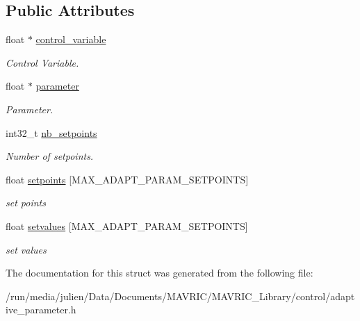 \subsection*{Public Attributes}
\begin{DoxyCompactItemize}
\item 
\hypertarget{structadaptive__parameter__t_a2214c801b54e043dba02bd31247350d7}{float $\ast$ \hyperlink{structadaptive__parameter__t_a2214c801b54e043dba02bd31247350d7}{control\+\_\+variable}}\label{structadaptive__parameter__t_a2214c801b54e043dba02bd31247350d7}

\begin{DoxyCompactList}\small\item\em Control Variable. \end{DoxyCompactList}\item 
\hypertarget{structadaptive__parameter__t_add568e1e24d0fe47caa8ff92d2de09b5}{float $\ast$ \hyperlink{structadaptive__parameter__t_add568e1e24d0fe47caa8ff92d2de09b5}{parameter}}\label{structadaptive__parameter__t_add568e1e24d0fe47caa8ff92d2de09b5}

\begin{DoxyCompactList}\small\item\em Parameter. \end{DoxyCompactList}\item 
\hypertarget{structadaptive__parameter__t_a210c6c63169d594762b9a87329bab5b0}{int32\+\_\+t \hyperlink{structadaptive__parameter__t_a210c6c63169d594762b9a87329bab5b0}{nb\+\_\+setpoints}}\label{structadaptive__parameter__t_a210c6c63169d594762b9a87329bab5b0}

\begin{DoxyCompactList}\small\item\em Number of setpoints. \end{DoxyCompactList}\item 
\hypertarget{structadaptive__parameter__t_a5226a7119476dbfa9e3da11aa798386a}{float \hyperlink{structadaptive__parameter__t_a5226a7119476dbfa9e3da11aa798386a}{setpoints} \mbox{[}M\+A\+X\+\_\+\+A\+D\+A\+P\+T\+\_\+\+P\+A\+R\+A\+M\+\_\+\+S\+E\+T\+P\+O\+I\+N\+T\+S\mbox{]}}\label{structadaptive__parameter__t_a5226a7119476dbfa9e3da11aa798386a}

\begin{DoxyCompactList}\small\item\em set points \end{DoxyCompactList}\item 
\hypertarget{structadaptive__parameter__t_af24f52ebf7fc9d40bead05710d23bc29}{float \hyperlink{structadaptive__parameter__t_af24f52ebf7fc9d40bead05710d23bc29}{setvalues} \mbox{[}M\+A\+X\+\_\+\+A\+D\+A\+P\+T\+\_\+\+P\+A\+R\+A\+M\+\_\+\+S\+E\+T\+P\+O\+I\+N\+T\+S\mbox{]}}\label{structadaptive__parameter__t_af24f52ebf7fc9d40bead05710d23bc29}

\begin{DoxyCompactList}\small\item\em set values \end{DoxyCompactList}\end{DoxyCompactItemize}


The documentation for this struct was generated from the following file\+:\begin{DoxyCompactItemize}
\item 
/run/media/julien/\+Data/\+Documents/\+M\+A\+V\+R\+I\+C/\+M\+A\+V\+R\+I\+C\+\_\+\+Library/control/adaptive\+\_\+parameter.\+h\end{DoxyCompactItemize}
